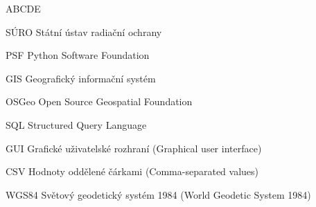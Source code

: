 
\begin{seznamzkratek}{ABCDE}

	      {SÚRO}
	      {Státní ústav radiační ochrany}
	      
		  {PSF}
	      {Python Software Foundation}

	      {GIS}
	      {Geografický informační systém}

	      {OSGeo}
	      {Open Source Geospatial Foundation}

	      {SQL}
	      {Structured Query Language}
	      
	      {GUI}
	      {Grafické uživatelské rozhraní (Graphical user interface)}
	      
	      {CSV}
	      {Hodnoty oddělené čárkami (Comma-separated values)}
	      
	      {WGS84}
	      {Světový geodetický systém 1984 (World Geodetic System 1984)}

\end{seznamzkratek}